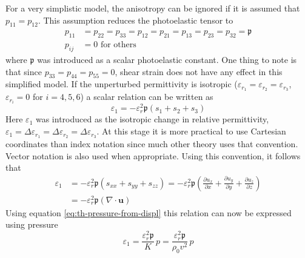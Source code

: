 \documentclass[11pt,twoside]{eitExjobb}
\begin{document}
	For a very simplistic model, the anisotropy can be ignored if it is assumed that $p_{11} = p_{12}$. This assumption reduces the photoelastic tensor to
	\begin{equation*}
	\begin{split}
		p_{11} &= p_{22} = p_{33} = p_{12} = p_{21} = p_{13} = p_{23} = p_{32} = \mathfrak{p}\\
		p_{ij} &= 0 \text{ for others}
	\end{split}
	\end{equation*}
	where $\mathfrak{p}$ was introduced as a scalar photoelastic constant. One thing to note is that since $p_{33} = p_{44} = p_{55} = 0$, shear strain does not have any effect in this simplified model. If the unperturbed permittivity is isotropic ($\varepsilon_{r_1} = \varepsilon_{r_2} = \varepsilon_{r_3}$, $\varepsilon_{r_i} = 0$ for $i=4,5,6$) a scalar relation can be written as
	\begin{equation*}
		\varepsilon_1 = -\varepsilon_r^2 \mathfrak{p} (s_1 + s_2 + s_3)
	\end{equation*}
	Here $\varepsilon_1$ was introduced as the isotropic change in relative permittivity, $\varepsilon_1 = \Delta \varepsilon_{r_1} = \Delta \varepsilon_{r_2} = \Delta \varepsilon_{r_3}$. At this stage it is more practical to use Cartesian coordinates than index notation since much other theory uses that convention. Vector notation is also used when appropriate. Using this convention, it follows that
	\begin{equation}
	\begin{split}
		\varepsilon_1 &= -\varepsilon_r^2 \mathfrak{p} (s_{xx} + s_{yy} + s_{zz}) = -\varepsilon_r^2 \mathfrak{p} \left( \frac{\partial u_x}{\partial x} + \frac{\partial u_y}{\partial y} + \frac{\partial u_z}{\partial z} \right) \\
		&= -\varepsilon_r^2 \mathfrak{p} (\nabla \cdot \bm{u})
	\end{split}
	\label{eq:th-PE-scalar}
	\end{equation}
	Using equation \eqref{eq:th-pressure-from-displ} this relation can now be expressed using pressure
	\begin{equation}
		\varepsilon_1 = \frac{\varepsilon_r^2 \mathfrak{p}}{K} \,p = \frac{\varepsilon_r^2 \mathfrak{p}}{\rho_0 v^2} \,p
		\label{eq:th-PE-scalar-p}
	\end{equation}
	
\end{document}
